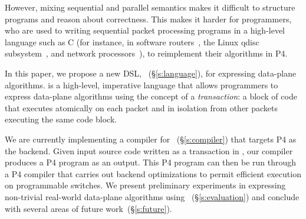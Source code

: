 However, mixing sequential and parallel semantics makes it difficult to
structure programs and reason about correctness. This makes it harder for
programmers, who are used to writing sequential packet processing programs in a
high-level language such as C (for instance, in software routers~\cite{click,
intel_multicore}, the Linux qdisc subsystem~\cite{qdisc}, and network
processors~\cite{npu}), to reimplement their algorithms in P4.

In this paper, we propose a new DSL, \pktlanguage~(\S\ref{s:language}), for
expressing data-plane algorithms. \pktlanguage is a high-level, imperative
language that allows programmers to express data-plane algorithms using the
concept of a {\em transaction}: a block of code that executes atomically on
each packet and in isolation from other packets executing the same code block.


%

We are currently implementing a compiler for \pktlanguage~(\S\ref{s:compiler})
that targets P4 as the backend. Given input source code written as a
transaction in \pktlanguage, our compiler produces a P4 program as an output.
This P4 program can then be run through a P4 compiler that carries out backend
optimizations to permit efficient execution on programmable switches.  We
present preliminary experiments in expressing non-trivial real-world data-plane
algorithms using \pktlanguage~(\S\ref{s:evaluation}) and conclude with several
areas of future work~(\S\ref{s:future}).
